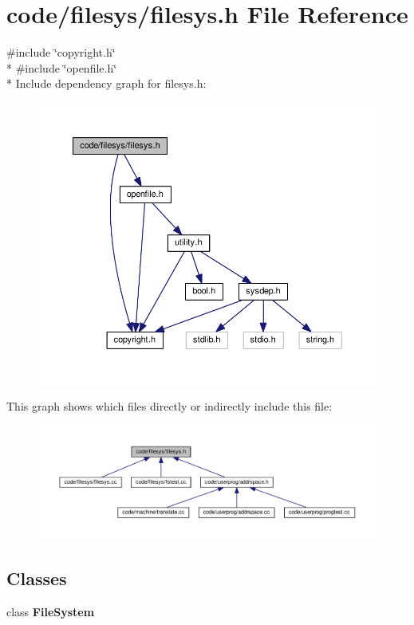 \section{code/filesys/filesys.h File Reference}
\label{filesys_8h}
{\ttfamily \#include \char`\"{}copyright.\+h\char`\"{}}\\*
{\ttfamily \#include \char`\"{}openfile.\+h\char`\"{}}\\*
Include dependency graph for filesys.\+h\+:
\nopagebreak
\begin{figure}[H]
\begin{center}
\leavevmode
\includegraphics[width=350pt]{filesys_8h__incl}
\end{center}
\end{figure}
This graph shows which files directly or indirectly include this file\+:
\nopagebreak
\begin{figure}[H]
\begin{center}
\leavevmode
\includegraphics[width=350pt]{filesys_8h__dep__incl}
\end{center}
\end{figure}
\subsection*{Classes}
\begin{DoxyCompactItemize}
\item 
class {\bf File\+System}
\end{DoxyCompactItemize}
